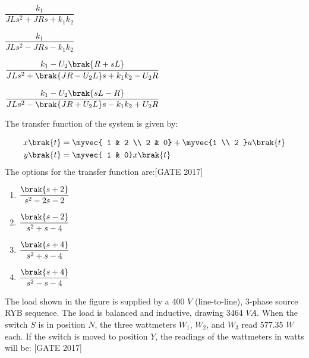 \begin{centering}
\end{centering}\begin{enumerate}
    \begin{multicols}{2}
        \item $\dfrac{k_1}{JL s^2 + JR s + k_1 k_2}$
        \item  $\dfrac{k_1}{JL s^2 - JR s - k_1 k_2}$
        \item  $\dfrac{k_1 - U_2 \brak{R + sL}}{JL s^2 + \brak{JR - U_2 L} s + k_1 k_2 - U_2 R}$
        \item  $\dfrac{k_1 - U_2 \brak{sL - R}}{JL s^2 - \brak{JR + U_2 L} s - k_1 k_2 + U_2 R}$
    \end{multicols}
\end{enumerate}
\item The transfer function of the system is given by:

\begin{align*}
x\brak{t} &= \myvec{ 1 & 2 \\ 2 & 0} + \myvec {1 \\ 2 } u\brak{t}  \\
y\brak{t} &= \myvec{ 1 & 0} x\brak{t}
\end{align*}
The options for the transfer function are:\hfill{[GATE 2017]} 
\begin{multicols}{2}
\begin{enumerate}
    \item $\dfrac{\brak{s + 2}}{s^2 - 2s - 2}$\\
    \item  $\dfrac{\brak{s - 2}}{s^2 + s - 4}$
    \item  $\dfrac{\brak{s + 4}}{s^2 + s - 4}$\\
    \item  $\dfrac{\brak{s + 4}}{s^2 - s - 4}$
\end{enumerate}     
\end{multicols}

\item The load shown in the figure is supplied by a 400 $V$ (line-to-line), 3-phase source RYB sequence. The load is balanced and inductive, drawing 3464 $VA$. When the switch $S$ is in position $ N $, the three wattmeters $W_1 $,  $W_2$, and $ W_3 $ read 577.35 $W$ each. If the switch is moved to position $Y$, the readings of the wattmeters in watts will be:
\hfill{[GATE 2017]} 

